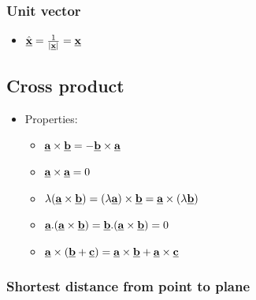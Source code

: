 \documentclass[10pt,a4paper]{article}
\begin{document}
\subsubsection{Unit vector}

\begin{itemize}
    \item $\hat{\textbf{\underline{x}}} = \frac{1}{|\textbf{\underline{x}}|}=\textbf{\underline{x}}$
\end{itemize}

\pagebreak

\subsection{Cross product}

\begin{itemize}
    \item Properties:
    \begin{itemize}
        \item $\textbf{\underline{a}}\times \textbf{\underline{b}}=-\textbf{\underline{b}}\times \textbf{\underline{a}}$
        \item $\textbf{\underline{a}}\times \textbf{\underline{a}}=0$
        \item $\lambda(\textbf{\underline{a}}\times \textbf{\underline{b}})=(\lambda
        \textbf{\underline{a}})\times \textbf{\underline{b}}=\textbf{\underline{a}}\times (\lambda
        \textbf{\underline{b}})$
        \item $\textbf{\underline{a}}.(\textbf{\underline{a}} \times \textbf{\underline{b}}) =
        \textbf{\underline{b}}.(\textbf{\underline{a}}\times \textbf{\underline{b}})=0$
        \item $\textbf{\underline{a}}\times
        (\textbf{\underline{b}}+\textbf{\underline{c}})=\textbf{\underline{a}}\times
        \textbf{\underline{b}}+\textbf{\underline{a}}\times \textbf{\underline{c}}$
    \end{itemize}
\end{itemize}

\subsubsection{Shortest distance from point to plane}
\end{document}
